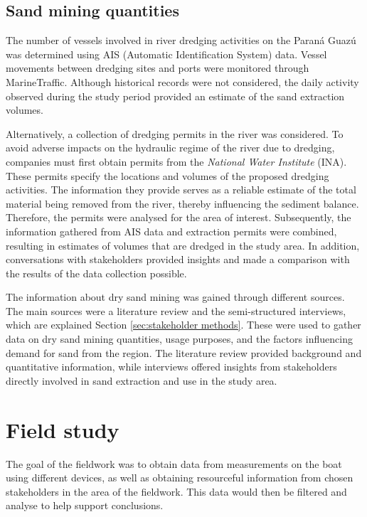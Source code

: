 \subsection{Sand mining quantities}
The number of vessels involved in river dredging activities on the Paraná Guazú was determined using AIS (Automatic Identification System) data. Vessel movements between dredging sites and ports were monitored through MarineTraffic. Although historical records were not considered, the daily activity observed during the study period provided an estimate of the sand extraction volumes. 

Alternatively, a collection of dredging permits in the river was considered. To avoid adverse impacts on the hydraulic regime of the river due to dredging, companies must first obtain permits from the \textit{National Water Institute} (INA). These permits specify the locations and volumes of the proposed dredging activities. The information they provide serves as a reliable estimate of the total material being removed from the river, thereby influencing the sediment balance. Therefore, the permits were analysed for the area of interest.
Subsequently, the information gathered from AIS data and extraction permits were combined, resulting in estimates of volumes that are dredged in the study area. In addition, conversations with stakeholders provided insights and made a comparison with the results of the data collection possible.

The information about dry sand mining was gained through different sources. The main sources were a literature review and the semi-structured interviews, which are explained Section \ref{sec:stakeholder methods}. These were used to gather data on dry sand mining quantities, usage purposes, and the factors influencing demand for sand from the region. The literature review provided background and quantitative information, while interviews offered insights from stakeholders directly involved in sand extraction and use in the study area.

\section{Field study}
\label{sec:field study}
The goal of the fieldwork was to obtain data from measurements on the boat using different devices, as well as obtaining resourceful information from chosen stakeholders in the area of the fieldwork. This data would then be filtered and analyse to help support conclusions.

